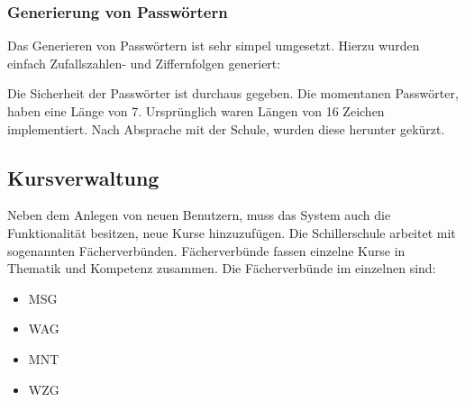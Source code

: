 	


\subsubsection{Generierung von Passwörtern}

Das Generieren von Passwörtern ist sehr simpel umgesetzt. Hierzu wurden einfach Zufallszahlen- und Ziffernfolgen generiert:

	
	
Die Sicherheit der Passwörter ist durchaus gegeben.
Die momentanen Passwörter, haben eine Länge von 7. Ursprünglich waren Längen von 16 Zeichen implementiert. Nach Absprache mit der Schule, wurden diese herunter gekürzt.

\subsection{Kursverwaltung}

Neben dem Anlegen von neuen Benutzern, muss das System auch die Funktionalität besitzen, neue Kurse hinzuzufügen.
Die Schillerschule arbeitet mit sogenannten Fächerverbünden. Fächerverbünde fassen einzelne Kurse in Thematik und Kompetenz zusammen.
Die Fächerverbünde im einzelnen sind:

\begin{itemize}
  \item \ac{MSG}

  \item \ac{WAG}
  
  \item \ac{MNT}
  
  \item \ac{WZG}
\end{itemize}

